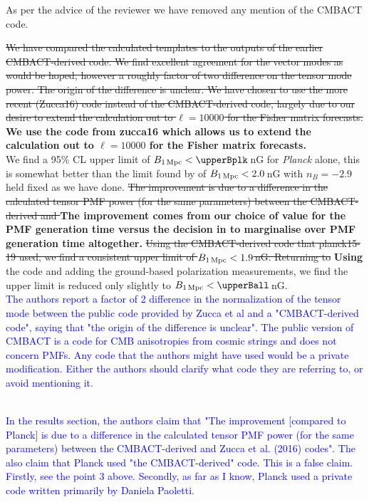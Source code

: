 \documentclass{article}
\newcommand{\bpmf}{\ensuremath{B_{\rm 1\,Mpc}}}
\newcommand{\planck}{{\sl Planck}}
\begin{document}
As per the advice of the reviewer we have removed any mention of the CMBACT code.

\textcolor{PineGreen}{
\st{
We have compared the calculated templates to the outputs of the earlier CMBACT-derived code.
We find excellent agreement  for the vector modes as would be hoped, however a roughly factor of two difference on the tensor mode power. 
The origin of the difference is unclear.
We have chosen to use the more recent (Zucca16) code instead of the CMBACT-derived code, largely due to our desire to extend the calculation out to $\ell=10000$ for the Fisher matrix forecasts.}
\textbf{We use the code from zucca16 which allows us to extend the calculation out to $\ell=10000$ for the Fisher matrix forecasts.}}
\\

\textcolor{PineGreen}{
We find a 95\% CL upper limit of $\bpmf < \upperBplk$\,nG for \planck{} alone,
this is somewhat better than the limit found by \citet{planck15-19} of $\bpmf < 2.0$\,nG with $n_B=-2.9$ held fixed as we have done.}
\textcolor{PineGreen}{
\st{The improvement is due to a difference in the calculated tensor PMF power (for the same parameters) between the CMBACT-derived and \citet{zucca16}}}
\textcolor{PineGreen}{
\textbf{The improvement comes from our choice of value for the PMF generation time versus the decision in \citet{planck15-19} to marginalise over PMF generation time altogether.}}
\textcolor{PineGreen}{
\st{Using the CMBACT-derived code that planck15-19 used, we find a consistent upper limit of $\bpmf < 1.9$\,nG.
Returning to} \textbf{Using} the \citet{zucca16} code and adding the ground-based polarization measurements, we find the upper limit is  reduced only slightly to $\bpmf < \upperBall$\,nG.}
\\

\textcolor{blue}{The authors report a factor of 2 difference in the normalization of the tensor mode between the public code provided by Zucca et al and a "CMBACT-derived code", saying that "the origin of the difference is unclear". The public version of CMBACT is a code for CMB anisotropies from cosmic strings and does not concern PMFs. Any code that the authors might have used would be a private modification. Either the authors should clarify what code they are referring to, or avoid mentioning it.}

\textcolor{pinegreen}{}
\\

\textcolor{blue}{In the results section, the authors claim that "The improvement [compared to Planck] is due to a difference in the calculated tensor PMF power (for the same
parameters) between the CMBACT-derived and Zucca et al. (2016) codes". The also claim that Planck used "the CMBACT-derived" code. This is a false claim. Firstly, see the point 3 above. Secondly, as far as I know, Planck used a private code written primarily by Daniela Paoletti.}
\end{document}
